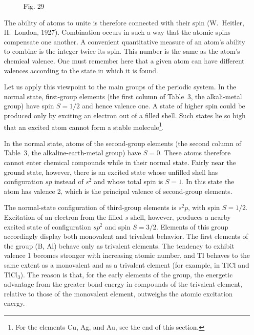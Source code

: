 \begin{figure}[ht]
\centering
{}
\caption*{Fig. 29}
\end{figure}

The ability of atoms to unite is therefore connected with their spin (W.~Heitler, H.~London, 1927). Combination occurs in such a way that the atomic spins compensate one another. A convenient quantitative measure of an atom's ability to combine is the integer twice its spin. This number is the same as the atom's chemical valence. One must remember here that a given atom can have different valences according to the state in which it is found.

Let us apply this viewpoint to the main groups of the periodic system. In the normal state, first-group elements (the first column of Table~3, the alkali-metal group) have spin $S=1/2$ and hence valence one. A state of higher spin could be produced only by exciting an electron out of a filled shell. Such states lie so high that an excited atom cannot form a stable molecule\footnote{For the elements Cu, Ag, and Au, see the end of this section.}.

In the normal state, atoms of the second-group elements (the second column of Table~3, the alkaline-earth-metal group) have $S=0$. These atoms therefore cannot enter chemical compounds while in their normal state. Fairly near the ground state, however, there is
an excited state whose unfilled shell has configuration $sp$ instead of $s^2$ and whose total spin is $S=1$. In this state the atom has valence 2, which is the principal valence of second-group elements.

The normal-state configuration of third-group elements is $s^2p$, with spin $S=1/2$. Excitation of an electron from the filled $s$ shell, however, produces a nearby excited state of configuration $sp^2$ and spin $S=3/2$. Elements of this group accordingly display both monovalent and trivalent behavior. The first elements of the group (B, Al) behave only as trivalent elements. The tendency to exhibit valence 1 becomes stronger with increasing atomic number, and Tl behaves to the same extent as a monovalent and as a trivalent element (for example, in TlCl and $\mathrm{TlCl}_3$). The reason is that, for the early elements of the group, the energetic advantage from the greater bond energy in compounds of the trivalent element, relative to those of the monovalent element, outweighs the atomic excitation energy.

